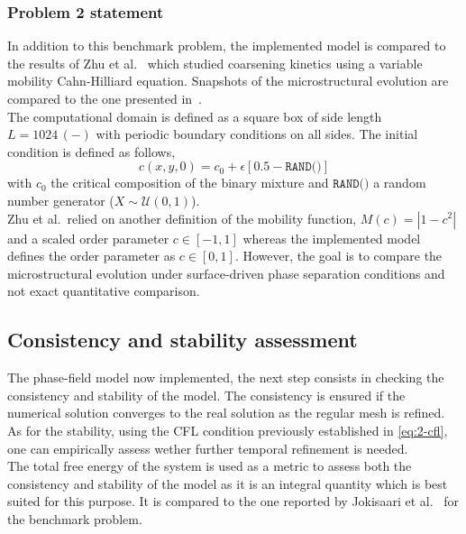     \subsubsection{Problem 2 statement}
    In addition to this benchmark problem, the implemented model is compared to the results of Zhu et al.\ \cite{ZhuChenShenTikare1999} which studied coarsening kinetics using a variable mobility Cahn-Hilliard equation. Snapshots of the microstructural evolution are compared to the one presented in\ \cite{ZhuChenShenTikare1999}.\\
    The computational domain is defined as a square box of side length $L=1024\,(-)$ with periodic boundary conditions on all sides. The initial condition is defined as follows,
    \begin{equation}
        c(x, y, 0) = c_0 + \epsilon \left[ 0.5 - \texttt{RAND()} \right]
    \end{equation}
    with $c_0$ the critical composition of the binary mixture and $\texttt{RAND()}$ a random number generator ($X\sim \mathcal{U}(0, 1)$).\\
    Zhu et al.\ relied on another definition of the mobility function, $M(c)=|1-c^2|$ and a scaled order parameter $c\in\left[-1,1\right]$ whereas the implemented model defines the order parameter as $c\in\left[0,1\right]$. However, the goal is to compare the microstructural evolution under surface-driven phase separation conditions and not exact quantitative comparison.
\subsection{Consistency and stability assessment}
    The phase-field model now implemented, the next step consists in checking the consistency and stability of the model. The consistency is ensured if the numerical solution converges to the real solution as the regular mesh is refined. As for the stability, using the CFL condition previously established in \autoref{eq:2-cfl}, one can empirically assess wether further temporal refinement is needed.\\
    The total free energy of the system is used as a metric to assess both the consistency and stability of the model as it is an integral quantity which is best suited for this purpose. It is compared to the one reported by Jokisaari et al.\ \cite{JokisaariVoorheesGuyerWarrenHeinonen2017} for the benchmark problem.
